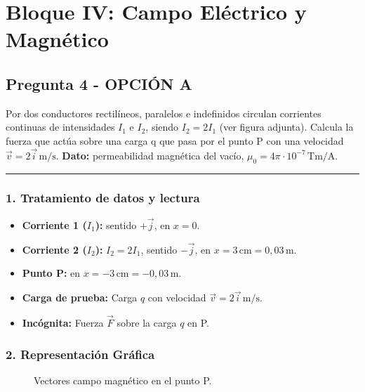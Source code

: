 \section{Bloque IV: Campo Eléctrico y Magnético}
\label{sec:em_2018_jul_ext}
\subsection{Pregunta 4 - OPCIÓN A}
\label{subsec:4A_2018_jul_ext}
\begin{cajaenunciado}
Por dos conductores rectilíneos, paralelos e indefinidos circulan corrientes continuas de intensidades $I_{1}$ e $I_{2}$, siendo $I_{2}=2I_{1}$ (ver figura adjunta). Calcula la fuerza que actúa sobre una carga q que pasa por el punto P con una velocidad $\vec{v}=2\vec{i}\,\text{m/s}$.
\textbf{Dato:} permeabilidad magnética del vacío, $\mu_{0}=4\pi\cdot10^{-7}\,\text{Tm/A}$.
\end{cajaenunciado}
\hrule
\subsubsection*{1. Tratamiento de datos y lectura}
\begin{itemize}
    \item \textbf{Corriente 1 ($I_1$):} sentido $+\vec{j}$, en $x=0$.
    \item \textbf{Corriente 2 ($I_2$):} $I_2=2I_1$, sentido $-\vec{j}$, en $x=3\,\text{cm}=0,03\,\text{m}$.
    \item \textbf{Punto P:} en $x=-3\,\text{cm}=-0,03\,\text{m}$.
    \item \textbf{Carga de prueba:} Carga $q$ con velocidad $\vec{v}=2\vec{i}\,\text{m/s}$.
    \item \textbf{Incógnita:} Fuerza $\vec{F}$ sobre la carga $q$ en P.
\end{itemize}
\subsubsection*{2. Representación Gráfica}
\begin{figure}[H]
    \centering
    \caption{Vectores campo magnético en el punto P.}
\end{figure}
